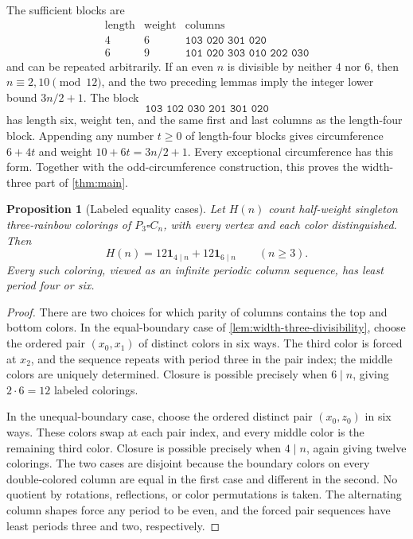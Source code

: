 \documentclass[11pt]{article}
\newtheorem{proposition}[theorem]{Proposition}
\theoremstyle{definition}
\theoremstyle{remark}
\newcommand{\ind}{\mathbf 1}
\begin{document}
The sufficient blocks are
\[
\begin{array}{c|c|l}
\text{length}&\text{weight}&\text{columns}\\
\hline
4&6&\texttt{103 020 301 020}\\
6&9&\texttt{101 020 303 010 202 030}
\end{array}
\]
and can be repeated arbitrarily. If an even $n$ is divisible by neither $4$ nor $6$, then $n\equiv 2,10\pmod {12}$, and the two preceding lemmas imply the integer lower bound $3n/2+1$. The block
\[
 \texttt{103 102 030 201 301 020}
\]
has length six, weight ten, and the same first and last columns as the length-four block. Appending any number $t\geq 0$ of length-four blocks gives circumference $6+4t$ and weight $10+6t=3n/2+1$. Every exceptional circumference has this form. Together with the odd-circumference construction, this proves the width-three part of \cref{thm:main}.

\begin{proposition}[Labeled equality cases]\label{prop:width-three-count}
Let $H(n)$ count half-weight singleton three-rainbow colorings of $P_3\square C_n$, with every vertex and each color distinguished. Then
\[
 H(n)=12\ind_{4\mid n}+12\ind_{6\mid n}\qquad(n\geq 3).
\]
Every such coloring, viewed as an infinite periodic column sequence, has least period four or six.
\end{proposition}

\begin{proof}
There are two choices for which parity of columns contains the top and bottom colors. In the equal-boundary case of \cref{lem:width-three-divisibility}, choose the ordered pair $(x_0,x_1)$ of distinct colors in six ways. The third color is forced at $x_2$, and the sequence repeats with period three in the pair index; the middle colors are uniquely determined. Closure is possible precisely when $6\mid n$, giving $2\cdot 6=12$ labeled colorings.

In the unequal-boundary case, choose the ordered distinct pair $(x_0,z_0)$ in six ways. These colors swap at each pair index, and every middle color is the remaining third color. Closure is possible precisely when $4\mid n$, again giving twelve colorings. The two cases are disjoint because the boundary colors on every double-colored column are equal in the first case and different in the second. No quotient by rotations, reflections, or color permutations is taken. The alternating column shapes force any period to be even, and the forced pair sequences have least periods three and two, respectively.
\end{proof}
\end{document}
